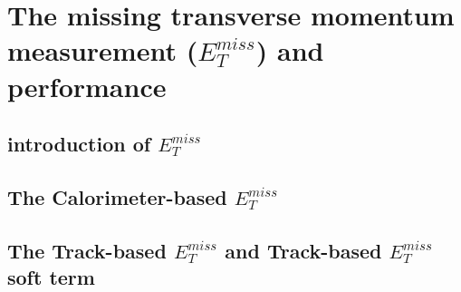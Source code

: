 \chapter{The missing transverse momentum measurement ($E_{T}^{miss}$) and performance}
\section{introduction of $E_{T}^{miss}$}
\section{The Calorimeter-based $E_{T}^{miss}$}
\section{The Track-based $E_{T}^{miss}$ and Track-based $E_{T}^{miss}$ soft term}
